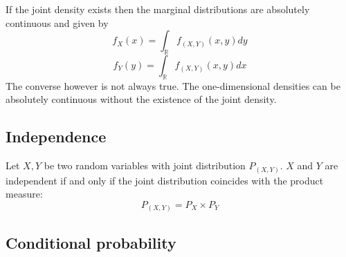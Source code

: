 	
	\begin{result}
		If the joint density exists then the marginal distributions are absolutely continuous and given by
	        \begin{equation}
			f_X(x) = \int_{\mathbb{R}}f_{(X, Y)}(x, y)dy
		\end{equation}
	        \begin{equation}
			f_Y(y) = \int_{\mathbb{R}}f_{(X, Y)}(x, y)dx
		\end{equation}
	        The converse however is not always true. The one-dimensional densities can be absolutely continuous without the existence of the joint density.
	\end{result}
    
\subsection{Independence}
    
	\begin{theorem}
		Let $X, Y$ be two random variables with joint distribution $P_{(X, Y)}$. $X$ and $Y$ are independent if and only if the joint distribution coincides with the product measure:
	        \begin{equation}
	        	P_{(X, Y)} = P_X\times P_Y
	        \end{equation}
	\end{theorem}
    
    
\subsection{Conditional probability}

